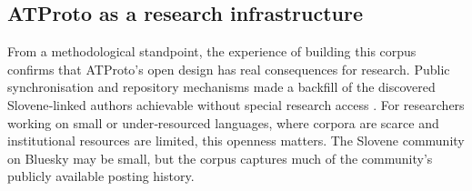 \subsection{ATProto as a research infrastructure}

From a methodological standpoint, the experience of building this corpus confirms that ATProto’s open design has real consequences for research. Public synchronisation and repository mechanisms made a backfill of the discovered Slovene‑linked authors achievable without special research access \parencite{atproto-sync,atproto-streaming}. For researchers working on small or under‑resourced languages, where corpora are scarce and institutional resources are limited, this openness matters. The Slovene community on Bluesky may be small, but the corpus captures much of the community’s publicly available posting history.
